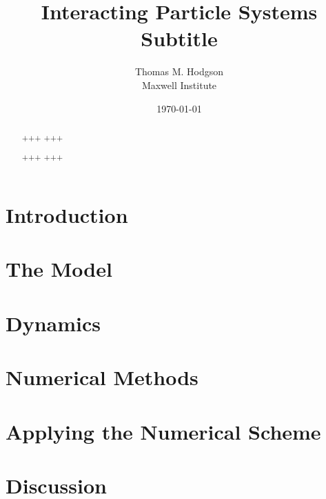 \documentclass[11pt, a4paper]{article}
\title{{\huge Interacting Particle Systems} \\ \vspace{1cm} Subtitle}
\author{Thomas M. Hodgson\\ \vspace{0.5cm} Maxwell Institute}
\date{\today}
\newcommand\testname{Acknowledgements}
\newenvironment{acknowledge}
{\renewcommand\abstractname{\testname}\begin{abstract}}
    {\end{abstract}}
\begin{document}
	\maketitle
    \thispagestyle{empty}
	\newpage
	\tableofcontents
	\listoffigures
	\newpage
    \begin{abstract}
        +++ +++
    \end{abstract}
    \begin{acknowledge}
        +++ +++
    \end{acknowledge}
      \newpage 
	\section{Introduction}\label{sec:introduction}
        
       
	\section{The Model}\label{sec:model}
        
        
	\section{Dynamics}\label{sec:dynamics}
        
        
   	\section{Numerical Methods}\label{sec:numericalmethods}
        
 
    \section{Applying the Numerical Scheme}\label{sec:application}
        
        
    \section{Discussion}\label{sec:discussion}
        

    
    
    \appendix
\end{document}
